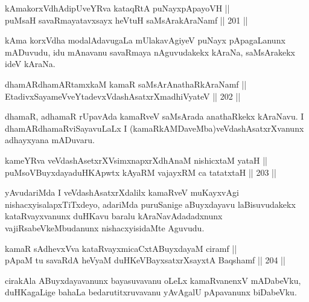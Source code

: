 
\begin{shl}
kAmakorxVdhAdipUveYRva kataqRtA puNayxpApayoVH || \\
puMsaH savaRmayatavxsayx heVtuH saMsArakAraNamf \hfill || 201 ||  
\end{shl}

\begin{artha}
kAma korxVdha modalAdavugaLa mUlakavAgiyeV puNayx pApagaLanunx
mADuvudu, idu mAnavanu savaRmaya nAguvudakekx kAraNa, saMsArakekx ideV
kAraNa.
\end{artha}


\begin{shl}
dhamARdhamARtamxkaM kamaR saMsArAnathaRkAraNamf || \\
EtadivxSayameVveYtadevxVdashAsatxrXmadhiVyateV \hfill || 202 ||  
\end{shl}

\begin{artha}
dhamaR, adhamaR rUpavAda kamaRveV saMsArada anathaRkekx kAraNavu. I
dhamARdhamaRviSayavuLaLx I (kamaRkAMDaveMba)veVdashAsatxrXvanunx
adhayxyana mADuvaru.
\end{artha}


\begin{shl}
kameYRva veVdashAsetxrXV\s simxnapxrXdhAnaM nishicxtaM yataH || \\
puMsoV\s BuyxdayaduHKApwtx kAyaRM vajayxRM ca tatatxtaH \hfill || 203 ||  
\end{shl}

\begin{artha}
yAvudariMda I veVdashAsatxrXdalilx kamaRveV muKayxvAgi
nishacxyisalapxTiTxdeyo, adariMda puruSanige aBuyxdayavu laBisuvudakekx
kataRvayxvanunx duHKavu baralu kAraNavAdadadxnunx
vajiRsabeVkeMbudanunx nishacxyisidaMte Aguvudu.
\end{artha}

\begin{shl}
kamaR sAdhevxVva kataRvayxmicaCxtA\s BuyxdayaM ciramf || \\
pApaM tu savaRdA heVyaM duHKeVBayxsatxrXsayxtA Baqshamf \hfill || 204 ||  
\end{shl}

\begin{artha}
cirakAla ABuyxdayavanunx bayasuvavanu oLeLx kamaRvanenxV mADabeVku,
duHKagaLige bahaLa bedarutitxruvavanu yAvAgalU pApavanunx biDabeVku.
\end{artha}

